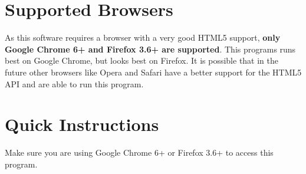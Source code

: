 \documentclass[letterpaper, 11pt]{article}
\begin{document}
\section{Supported Browsers}
As this software requires a browser with a very good HTML5 support, {\bf only Google Chrome 6+ and  Firefox 3.6+ are supported}. This programs runs best on Google Chrome, but looks best on Firefox. It is possible that in the future other browsers like Opera and Safari have a better support for the HTML5 API and are able to run this program.

\section{Quick Instructions}
Make sure you are using Google Chrome 6+ or Firefox 3.6+ to access this program.
\end{document}
